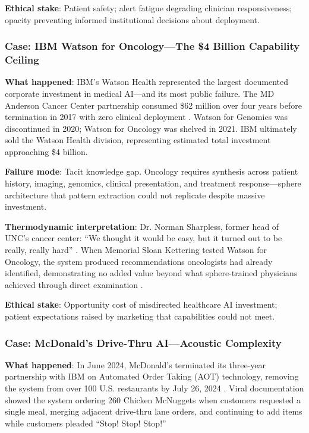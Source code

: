 \textbf{Ethical stake}: Patient safety; alert fatigue degrading clinician responsiveness; opacity preventing informed institutional decisions about deployment.

\subsubsection{Case: IBM Watson for Oncology---The \$4 Billion Capability Ceiling}

\textbf{What happened}: IBM's Watson Health represented the largest documented corporate investment in medical AI---and its most public failure. The MD Anderson Cancer Center partnership consumed \$62 million over four years before termination in 2017 with zero clinical deployment \citep{nytimes2021watson, forbes2017watson}. Watson for Genomics was discontinued in 2020; Watson for Oncology was shelved in 2021. IBM ultimately sold the Watson Health division, representing estimated total investment approaching \$4 billion.

\textbf{Failure mode}: Tacit knowledge gap. Oncology requires synthesis across patient history, imaging, genomics, clinical presentation, and treatment response---sphere architecture that pattern extraction could not replicate despite massive investment.

\textbf{Thermodynamic interpretation}: Dr. Norman Sharpless, former head of UNC's cancer center: ``We thought it would be easy, but it turned out to be really, really hard'' \citep{nytimes2021watson}. When Memorial Sloan Kettering tested Watson for Oncology, the system produced recommendations oncologists had already identified, demonstrating no added value beyond what sphere-trained physicians achieved through direct examination \citep{stat2017watson}.

\textbf{Ethical stake}: Opportunity cost of misdirected healthcare AI investment; patient expectations raised by marketing that capabilities could not meet.

\subsubsection{Case: McDonald's Drive-Thru AI---Acoustic Complexity}

\textbf{What happened}: In June 2024, McDonald's terminated its three-year partnership with IBM on Automated Order Taking (AOT) technology, removing the system from over 100 U.S. restaurants by July 26, 2024 \citep{restaurantbusiness2024}. Viral documentation showed the system ordering 260 Chicken McNuggets when customers requested a single meal, merging adjacent drive-thru lane orders, and continuing to add items while customers pleaded ``Stop! Stop! Stop!''

